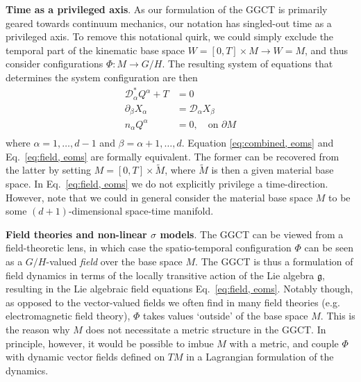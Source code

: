 \textbf{Time as a privileged axis}. As our formulation of the GGCT is primarily geared towards continuum mechanics, our notation has singled-out time as a privileged axis. To remove this notational quirk, we could simply exclude the temporal part of the kinematic base space $W = [0, T] \times M \to W = M$, and thus consider configurations $\Phi : M \to G/H$. The resulting system of equations that determines the system configuration are then
\begin{subequations} \label{eq:field, eoms}
\begin{align}
\mathcal{D}^*_\alpha Q^\alpha + T & = 0 \\
\partial_\beta X_\alpha & = \mathcal{D}_\alpha X_\beta \label{eq:field, spatial integrability} \\
n_\alpha Q^\alpha & = 0, \quad \text{on } \partial M \label{eq:field, boundary conditions} \\
\end{align} 
\end{subequations}
where $\alpha = 1, \dots, d-1$ and $\beta = \alpha+1, \dots, d$. Equation \ref{eq:combined, eoms} and Eq.~\ref{eq:field, eoms} are formally equivalent. The former can be recovered from the latter by setting $M = [0, T] \times \tilde{M}$, where $\tilde{M}$ is then a given material base space. In Eq.~\ref{eq:field, eoms} we do not explicitly privilege a time-direction. However, note that we could in general consider the material base space $M$ to be some $(d+1)$-dimensional space-time manifold.

\textbf{Field theories and non-linear $\sigma$ models}. The GGCT can be viewed from a field-theoretic lens, in which case the spatio-temporal configuration $\Phi$ can be seen as a $G/H$-valued \textit{field} over the base space $M$. The GGCT is thus a formulation of field dynamics in terms of the locally transitive action of the Lie algebra $\mathfrak{g}$, resulting in the Lie algebraic field equations Eq.~\ref{eq:field, eoms}. Notably though, as opposed to the vector-valued fields we often find in many field theories (e.g. electromagnetic field theory), $\Phi$ takes values `outside' of the base space $M$. This is the reason why $M$ does not necessitate a metric structure in the GGCT. In principle, however, it would be possible to imbue $M$ with a metric, and couple $\Phi$ with dynamic vector fields defined on $TM$ in a Lagrangian formulation of the dynamics.

